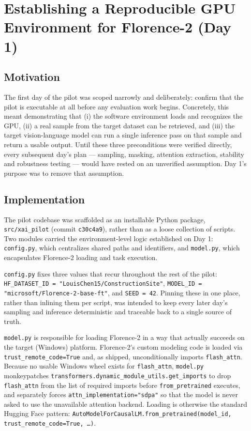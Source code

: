 \chapter{Establishing a Reproducible GPU Environment for Florence-2 (Day 1)}
\label{chap:day01}

\section{Motivation}

The first day of the pilot was scoped narrowly and deliberately: confirm that the pilot is
executable at all before any evaluation work begins. Concretely, this meant demonstrating that
(i) the software environment loads and recognizes the GPU, (ii) a real sample from the target
dataset can be retrieved, and (iii) the target vision-language model can run a single inference
pass on that sample and return a usable output. Until these three preconditions were verified
directly, every subsequent day's plan --- sampling, masking, attention extraction, stability and
robustness testing --- would have rested on an unverified assumption. Day 1's purpose was to
remove that assumption.

\section{Implementation}

The pilot codebase was scaffolded as an installable Python package, \texttt{src/xai\_pilot}
(commit \texttt{c30c4a9}), rather than as a loose collection of scripts. Two modules carried the
environment-level logic established on Day 1: \texttt{config.py}, which centralizes shared paths
and identifiers, and \texttt{model.py}, which encapsulates Florence-2 loading and task execution.

\texttt{config.py} fixes three values that recur throughout the rest of the pilot:
\texttt{HF\_DATASET\_ID = "LouisChen15/ConstructionSite"}, \texttt{MODEL\_ID =
"microsoft/Florence-2-base-ft"}, and \texttt{SEED = 42}. Pinning these in one place, rather than
inlining them per script, was intended to keep every later day's sampling and inference
deterministic and traceable back to a single source of truth.

\texttt{model.py} is responsible for loading Florence-2 in a way that actually succeeds on the
target (Windows) platform. Florence-2's custom modeling code is loaded via
\texttt{trust\_remote\_code=True} and, as shipped, unconditionally imports \texttt{flash\_attn}.
Because no usable Windows wheel exists for \texttt{flash\_attn}, \texttt{model.py} monkeypatches
\texttt{transformers.dynamic\_module\_utils.get\_imports} to drop \texttt{flash\_attn} from the
list of required imports before \texttt{from\_pretrained} executes, and separately forces
\texttt{attn\_implementation="sdpa"} so that the model is never asked to use the unavailable
attention backend. Loading is otherwise the standard Hugging Face pattern:
\texttt{AutoModelForCausalLM.from\_pretrained(model\_id, trust\_remote\_code=True, \ldots)}.

